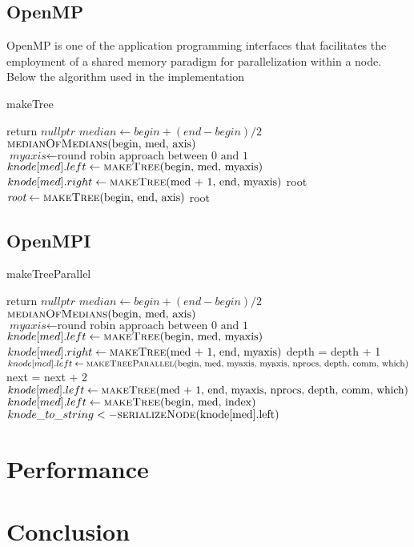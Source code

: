 \documentclass[11pt,a4paper]{article}
\begin{document}
\subsection{OpenMP}
OpenMP is one of the application programming interfaces that facilitates the employment of a shared memory paradigm for parallelization within a node. Below the algorithm used in the implementation
\begin{algorithm}[H]
\caption{makeTree}
\begin{algorithmic}[1]
\State return $\textit{nullptr}$
\EndIf
\State $\textit{median} \gets begin + (end - begin) / 2$
\State $\Call{medianOfMedians}{$begin, med, axis$}$
\State $\textit{myaxis} \gets \text{round robin approach between 0 and 1}$
\color{blue}
\color{black}
\State $knode[med].left \gets \Call{makeTree}{$begin, med, myaxis$}$
\color{blue}
\color{black}
\State $knode[med].right \gets \Call{makeTree}{$med + 1, end, myaxis$}$
\State \Return {}
\EndFunction
\Statex
{}
\State root
\color{blue}
\color{black}
\State $\textit{root} \gets \Call{makeTree}{$begin, end, axis$}$
\State \Return root
\EndFunction
\end{algorithmic}
\end{algorithm}
\subsection{OpenMPI}
\begin{algorithm}[H]
\caption{makeTreeParallel}
\begin{algorithmic}[1]
\State return $\textit{nullptr}$
\EndIf
\State $\textit{median} \gets begin + (end - begin) / 2$
\State $\Call{medianOfMedians}{$begin, med, axis$}$
\State $\textit{myaxis} \gets \text{round robin approach between 0 and 1}$
\State $knode[med].left \gets \Call{makeTree}{$begin, med, myaxis$}$
\State $knode[med].right \gets \Call{makeTree}{$med + 1, end, myaxis$}$
\State depth = depth + 1
\State $knode[med].left \gets \Call{makeTreeParallel}{$begin, med, myaxis, myaxis, nprocs, depth, comm, which$}$
\State next = next + 2
\State $knode[med].left \gets \Call{makeTree}{$med + 1, end, myaxis, nprocs, depth, comm, which$}$
\Else
{}
\color{blue}
\color{black}
\State $knode[med].left \gets \Call{makeTree}{$begin, med, index$}$
\color{red}
\State $knode\_to\_string <- \Call{serializeNode}{$knode[med].left$}$
\color{black}
\color{green}
\color{black}
\EndIf
\EndIf
\EndIf
\State \Return {}
\EndFunction
\end{algorithmic}
\end{algorithm}
\section{Performance}
\section{Conclusion}
\end{document}
